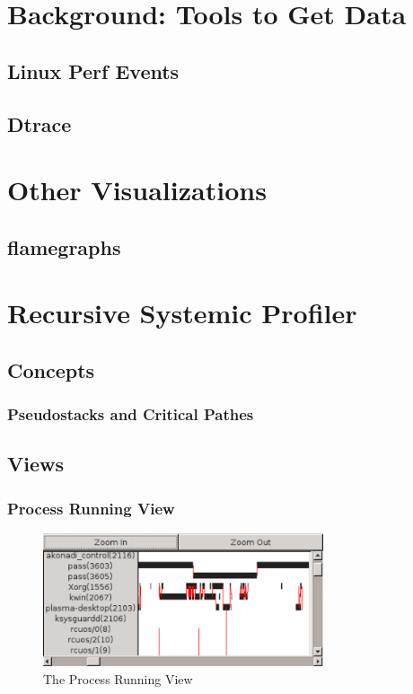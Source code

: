 \documentclass[10pt]{article}
\begin{document}
\section{Background: Tools to Get Data}

\subsection{Linux Perf Events}

\subsection{Dtrace}

\section{Other Visualizations}

\subsection{flamegraphs}

\section{Recursive Systemic Profiler}

\subsection{Concepts}

\subsubsection{Pseudostacks and Critical Pathes}

\subsection{Views}

\subsubsection{Process Running View}

\begin{figure}[h]
\includegraphics[width=3.25in]{screenshot}
\caption{The Process Running View}
\end{figure}
\end{document}

